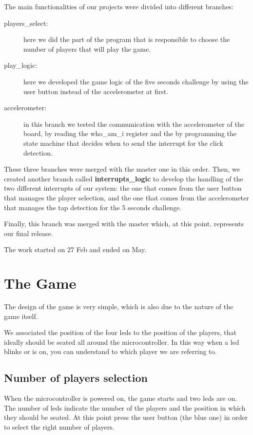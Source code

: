 The main functionalities of our projects were divided into different branches:
\begin{description}
  \item [players\_select:] here we did the part of the program that is
    responsible to choose the number of players that will play the game.
  \item [play\_logic:] here we developed the game logic of the five seconds
    challenge by using the user button instead of the accelerometer at first.
  \item [accelerometer:] in this branch we tested the communication with the
    accelerometer of the board, by reading the who\_am\_i register and the by
    programming the state machine that decides when to send the interrupt for
    the click detection.
\end{description}

These three branches were merged with the master one in this order. Then, we
created another branch called \textbf{interrupts\_logic} to develop the handling of the two different interrupts
of our system: the one that comes from the user button that manages the player
selection, and the one that comes from the accelerometer that manages the tap
detection for the 5 seconds challenge.

Finally, this branch was merged with the master which, at this point, represents our final release.

The work started on 27 Feb and ended on May.

\pagebreak

\section{The Game}
The design of the game is very simple, which is also due to the nature of the game itself.

We associated the position of the four leds to the position of the players, that
ideally should be seated all around the microcontroller.
In this way when a led blinks or is on, you can understand to which player we
are referring to.

\subsection{Number of players selection}
When the microcontroller is powered on, the game starts and two leds are on.
The number of leds indicate the number of the players and the position in which
they should be seated.
At this point press the user button (the blue one) in order to select the right
number of players.

